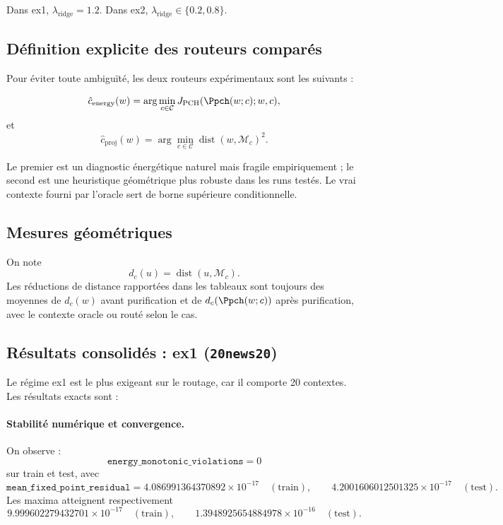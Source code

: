 Dans ex1, \(\lambda_{\mathrm{ridge}}=1.2\). Dans ex2, \(\lambda_{\mathrm{ridge}}\in\{0.2,0.8\}\).

\subsection{Définition explicite des routeurs comparés}

Pour éviter toute ambiguïté, les deux routeurs expérimentaux sont les suivants :

\[
\hat c_{\mathrm{energy}}(w)
=
\arg\min_{c\in\mathcal C}
J_{\mathrm{PCH}}(\Ppch(w;c);w,c),
\]
et
\[
\hat c_{\mathrm{proj}}(w)
=
\arg\min_{c\in\mathcal C}
\operatorname{dist}(w,\mathcal M_c)^2.
\]

Le premier est un diagnostic énergétique naturel mais fragile empiriquement ; le second est une heuristique géométrique plus robuste dans les runs testés. Le vrai contexte fourni par l’oracle sert de borne supérieure conditionnelle.

\subsection{Mesures géométriques}

On note
\[
d_c(u)=\operatorname{dist}(u,\mathcal M_c).
\]
Les réductions de distance rapportées dans les tableaux sont toujours des moyennes de \(d_c(w)\) avant purification et de \(d_c(\Ppch(w;c))\) après purification, avec le contexte oracle ou routé selon le cas.

\subsection{Résultats consolidés : ex1 (\texttt{20news20})}

Le régime ex1 est le plus exigeant sur le routage, car il comporte 20 contextes. Les résultats exacts sont :

\paragraph{Stabilité numérique et convergence.}
On observe :
\[
\texttt{energy\_monotonic\_violations}=0
\]
sur train et test, avec
\[
\texttt{mean\_fixed\_point\_residual}
=
4.086991364370892\times 10^{-17}\quad(\text{train}),
\qquad
4.2001606012501325\times 10^{-17}\quad(\text{test}).
\]
Les maxima atteignent respectivement
\[
9.999602279432701\times 10^{-17}\quad(\text{train}),
\qquad
1.3948925654884978\times 10^{-16}\quad(\text{test}).
\]

